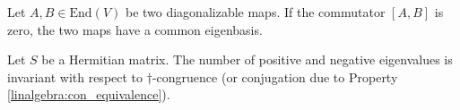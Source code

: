     \begin{property}
        Let $A,B\in\text{End}(V)$ be two diagonalizable maps. If the commutator $[A,B]$ is zero, the two maps have a common eigenbasis.
    \end{property}

    \begin{theorem}
        Let $S$ be a Hermitian matrix. The number of positive and negative eigenvalues is invariant with respect to $\dag$-congruence (or conjugation due to Property \ref{linalgebra:con_equivalence}).
    \end{theorem}